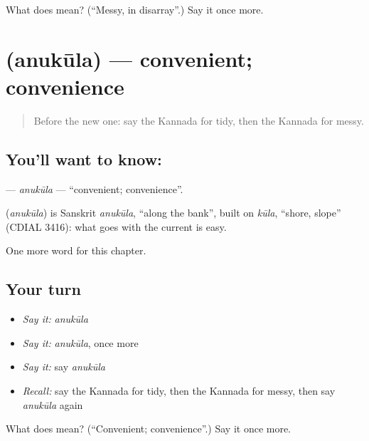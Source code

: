 \begin{tcolorbox}[breakable,colback=teal!4,colframe=teal!35!black,title={Before you move on}]
What does  mean? (\textquotedblleft{}Messy, in disarray\textquotedblright{}.) Say it once more.
\end{tcolorbox}
\section[\texorpdfstring{\kn{ಅನುಕೂಲ} (anukūla)}{ಅನುಕೂಲ (anukūla)}]{ (anukūla) — convenient; convenience}

\label{lesson:KA-C292-anukula}



\begin{quote}
Before the new one: say the Kannada for tidy, then the Kannada for messy.
\end{quote}

\subsection*{You'll want to know: }
\textbf{} — \emph{anukūla} — \textquotedblleft{}convenient; convenience\textquotedblright{}.

\begin{cousinweb}
\textbf{} (\emph{anukūla}) is Sanskrit \emph{anukūla}, \textquotedblleft{}along the bank\textquotedblright{}, built on \emph{kūla}, \textquotedblleft{}shore, slope\textquotedblright{} (CDIAL 3416): what goes with the current is easy.
\end{cousinweb}

\begin{grammarlens}[title={What you've built}]
One more word for this chapter.
\end{grammarlens}

\subsection*{Your turn}
\begin{itemize}
\raggedright
  \item \emph{Say it:} \emph{anukūla}
  \item \emph{Say it:} \emph{anukūla}, once more
  \item \emph{Say it:} say \emph{anukūla}
  \item \emph{Recall:} say the Kannada for tidy, then the Kannada for messy, then say \emph{anukūla} again
\end{itemize}

\begin{tcolorbox}[breakable,colback=teal!4,colframe=teal!35!black,title={Before you move on}]
What does  mean? (\textquotedblleft{}Convenient; convenience\textquotedblright{}.) Say it once more.
\end{tcolorbox}

